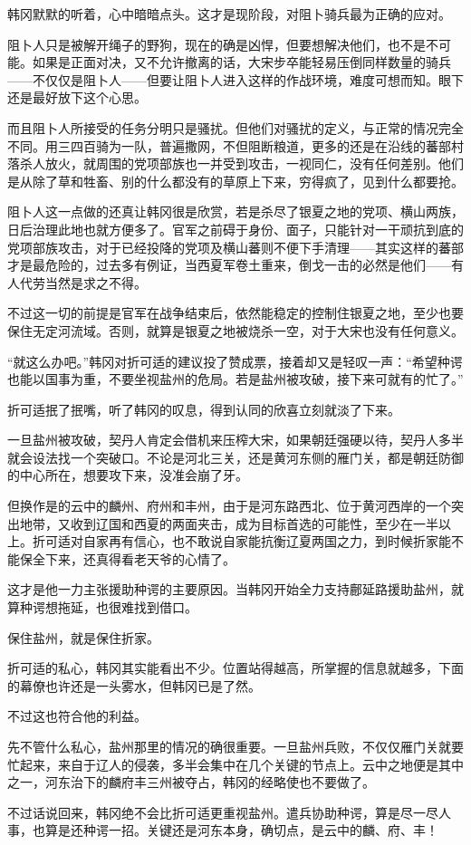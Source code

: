 韩冈默默的听着，心中暗暗点头。这才是现阶段，对阻卜骑兵最为正确的应对。

阻卜人只是被解开绳子的野狗，现在的确是凶悍，但要想解决他们，也不是不可能。如果是正面对决，又不允许撤离的话，大宋步卒能轻易压倒同样数量的骑兵——不仅仅是阻卜人——但要让阻卜人进入这样的作战环境，难度可想而知。眼下还是最好放下这个心思。

而且阻卜人所接受的任务分明只是骚扰。但他们对骚扰的定义，与正常的情况完全不同。用三四百骑为一队，普遍撒网，不但阻断粮道，更多的还是在沿线的蕃部村落杀人放火，就周围的党项部族也一并受到攻击，一视同仁，没有任何差别。他们是从除了草和牲畜、别的什么都没有的草原上下来，穷得疯了，见到什么都要抢。

阻卜人这一点做的还真让韩冈很是欣赏，若是杀尽了银夏之地的党项、横山两族，日后治理此地也就方便多了。官军之前碍于身份、面子，只能针对一干顽抗到底的党项部族攻击，对于已经投降的党项及横山蕃则不便下手清理——其实这样的蕃部才是最危险的，过去多有例证，当西夏军卷土重来，倒戈一击的必然是他们——有人代劳当然是求之不得。

不过这一切的前提是官军在战争结束后，依然能稳定的控制住银夏之地，至少也要保住无定河流域。否则，就算是银夏之地被烧杀一空，对于大宋也没有任何意义。

“就这么办吧。”韩冈对折可适的建议投了赞成票，接着却又是轻叹一声：“希望种谔也能以国事为重，不要坐视盐州的危局。若是盐州被攻破，接下来可就有的忙了。”

折可适抿了抿嘴，听了韩冈的叹息，得到认同的欣喜立刻就淡了下来。

一旦盐州被攻破，契丹人肯定会借机来压榨大宋，如果朝廷强硬以待，契丹人多半就会设法找一个突破口。不论是河北三关，还是黄河东侧的雁门关，都是朝廷防御的中心所在，想要攻下来，没准会崩了牙。

但换作是的云中的麟州、府州和丰州，由于是河东路西北、位于黄河西岸的一个突出地带，又收到辽国和西夏的两面夹击，成为目标首选的可能性，至少在一半以上。折可适对自家再有信心，也不敢说自家能抗衡辽夏两国之力，到时候折家能不能保全下来，还真得看老天爷的心情了。

这才是他一力主张援助种谔的主要原因。当韩冈开始全力支持鄜延路援助盐州，就算种谔想拖延，也很难找到借口。

保住盐州，就是保住折家。

折可适的私心，韩冈其实能看出不少。位置站得越高，所掌握的信息就越多，下面的幕僚也许还是一头雾水，但韩冈已是了然。

不过这也符合他的利益。

先不管什么私心，盐州那里的情况的确很重要。一旦盐州兵败，不仅仅雁门关就要忙起来，来自于辽人的侵袭，多半会集中在几个关键的节点上。云中之地便是其中之一，河东治下的麟府丰三州被夺占，韩冈的经略使也不要做了。

不过话说回来，韩冈绝不会比折可适更重视盐州。遣兵协助种谔，算是尽一尽人事，也算是还种谔一招。关键还是河东本身，确切点，是云中的麟、府、丰！

